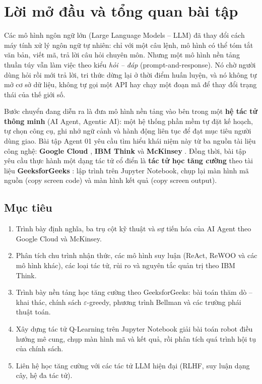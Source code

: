 \chapter*{Lời mở đầu và tổng quan bài tập}

Các mô hình ngôn ngữ lớn (Large Language Models -- LLM) đã thay đổi cách máy tính xử lý ngôn ngữ tự nhiên: chỉ với một
câu lệnh, mô hình có thể tóm tắt văn bản, viết mã, trả lời câu hỏi chuyên môn. Nhưng một mô hình nền tảng thuần túy vẫn
làm việc theo kiểu \emph{hỏi -- đáp} (prompt-and-response). Nó chờ người dùng hỏi rồi mới trả lời, tri thức dừng lại ở
thời điểm huấn luyện, và nó không tự mở cơ sở dữ liệu, không tự gọi một API hay chạy một đoạn mã để thay đổi trạng thái
của thế giới số.

Bước chuyển đang diễn ra là đưa mô hình nền tảng vào bên trong một \textbf{hệ tác tử thông minh} (AI Agent, Agentic AI):
một hệ thống phần mềm tự đặt kế hoạch, tự chọn công cụ, ghi nhớ ngữ cảnh và hành động liên tục để đạt mục tiêu người dùng
giao. Bài tập Agent 01 yêu cầu tìm hiểu khái niệm này từ ba nguồn tài liệu công nghệ: \textbf{Google Cloud}
\cite{google_agents}, \textbf{IBM Think} \cite{ibm_agents} và \textbf{McKinsey} \cite{mckinsey_agents}. Đồng thời, bài tập
yêu cầu thực hành một dạng tác tử cổ điển là \textbf{tác tử học tăng cường} theo tài liệu \textbf{GeeksforGeeks}
\cite{gfg_rl}: lập trình trên Jupyter Notebook, chụp lại màn hình mã nguồn (copy screen code) và màn hình kết quả
(copy screen output).

\section*{Mục tiêu}
\begin{enumerate}
  \item Trình bày định nghĩa, ba trụ cột kỹ thuật và sự tiến hóa của AI Agent theo Google Cloud và McKinsey.
  \item Phân tích chu trình nhận thức, các mô hình suy luận (ReAct, ReWOO và các mô hình khác), các loại tác tử, rủi ro và
        nguyên tắc quản trị theo IBM Think.
  \item Trình bày nền tảng học tăng cường theo GeeksforGeeks: bài toán thăm dò -- khai thác, chính sách
        $\varepsilon$-greedy, phương trình Bellman và các trường phái thuật toán.
  \item Xây dựng tác tử Q-Learning trên Jupyter Notebook giải bài toán robot điều hướng mê cung, chụp màn hình mã và kết quả,
        rồi phân tích quá trình hội tụ của chính sách.
  \item Liên hệ học tăng cường với các tác tử LLM hiện đại (RLHF, suy luận dạng cây, hệ đa tác tử).
\end{enumerate}

